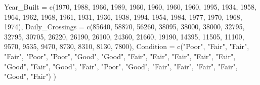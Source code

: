 \documentclass[
  letterpaper,
  DIV=11,
  numbers=noendperiod]{scrreprt}
\newenvironment{Shaded}{\begin{snugshade}}{\end{snugshade}}
\newcommand{\AttributeTok}[1]{\textcolor[rgb]{0.40,0.45,0.13}{#1}}
\newcommand{\DecValTok}[1]{\textcolor[rgb]{0.68,0.00,0.00}{#1}}
\newcommand{\FunctionTok}[1]{\textcolor[rgb]{0.28,0.35,0.67}{#1}}
\newcommand{\NormalTok}[1]{\textcolor[rgb]{0.00,0.23,0.31}{#1}}
\newcommand{\StringTok}[1]{\textcolor[rgb]{0.13,0.47,0.30}{#1}}
\begin{document}
\begin{Shaded}
\begin{Highlighting}[]
  \AttributeTok{Year\_Built =} \FunctionTok{c}\NormalTok{(}\DecValTok{1970}\NormalTok{, }\DecValTok{1988}\NormalTok{, }\DecValTok{1966}\NormalTok{, }\DecValTok{1989}\NormalTok{, }\DecValTok{1960}\NormalTok{, }\DecValTok{1960}\NormalTok{, }\DecValTok{1960}\NormalTok{, }\DecValTok{1960}\NormalTok{, }\DecValTok{1995}\NormalTok{, }\DecValTok{1934}\NormalTok{, }\DecValTok{1958}\NormalTok{, }\DecValTok{1964}\NormalTok{, }\DecValTok{1962}\NormalTok{, }\DecValTok{1968}\NormalTok{, }\DecValTok{1961}\NormalTok{, }
                 \DecValTok{1931}\NormalTok{, }\DecValTok{1936}\NormalTok{, }\DecValTok{1938}\NormalTok{, }\DecValTok{1994}\NormalTok{, }\DecValTok{1954}\NormalTok{, }\DecValTok{1984}\NormalTok{, }\DecValTok{1977}\NormalTok{, }\DecValTok{1970}\NormalTok{, }\DecValTok{1968}\NormalTok{, }\DecValTok{1974}\NormalTok{),}
  \AttributeTok{Daily\_Crossings =} \FunctionTok{c}\NormalTok{(}\DecValTok{85640}\NormalTok{, }\DecValTok{58870}\NormalTok{, }\DecValTok{56260}\NormalTok{, }\DecValTok{38095}\NormalTok{, }\DecValTok{38000}\NormalTok{, }\DecValTok{38000}\NormalTok{, }\DecValTok{32795}\NormalTok{, }\DecValTok{32795}\NormalTok{, }\DecValTok{30705}\NormalTok{, }\DecValTok{26220}\NormalTok{, }\DecValTok{26190}\NormalTok{, }
                      \DecValTok{26100}\NormalTok{, }\DecValTok{24360}\NormalTok{, }\DecValTok{21660}\NormalTok{, }\DecValTok{19190}\NormalTok{, }\DecValTok{14395}\NormalTok{, }\DecValTok{11505}\NormalTok{, }\DecValTok{11100}\NormalTok{, }\DecValTok{9570}\NormalTok{, }\DecValTok{9535}\NormalTok{, }\DecValTok{9470}\NormalTok{, }\DecValTok{8730}\NormalTok{, }\DecValTok{8310}\NormalTok{, }\DecValTok{8130}\NormalTok{, }\DecValTok{7800}\NormalTok{),}
  \AttributeTok{Condition =} \FunctionTok{c}\NormalTok{(}\StringTok{"Poor"}\NormalTok{, }\StringTok{"Fair"}\NormalTok{, }\StringTok{"Fair"}\NormalTok{, }\StringTok{"Fair"}\NormalTok{, }\StringTok{"Poor"}\NormalTok{, }\StringTok{"Poor"}\NormalTok{, }\StringTok{"Good"}\NormalTok{, }\StringTok{"Good"}\NormalTok{, }\StringTok{"Fair"}\NormalTok{, }\StringTok{"Fair"}\NormalTok{, }\StringTok{"Fair"}\NormalTok{, }
                \StringTok{"Fair"}\NormalTok{, }\StringTok{"Fair"}\NormalTok{, }\StringTok{"Good"}\NormalTok{, }\StringTok{"Fair"}\NormalTok{, }\StringTok{"Good"}\NormalTok{, }\StringTok{"Fair"}\NormalTok{, }\StringTok{"Poor"}\NormalTok{, }\StringTok{"Good"}\NormalTok{, }\StringTok{"Fair"}\NormalTok{, }\StringTok{"Fair"}\NormalTok{, }\StringTok{"Fair"}\NormalTok{, }
                \StringTok{"Fair"}\NormalTok{, }\StringTok{"Good"}\NormalTok{, }\StringTok{"Fair"}\NormalTok{)}
\NormalTok{)}


\end{Highlighting}
\end{Shaded}
\end{document}
